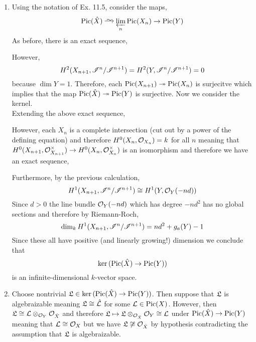 \documentclass[12pt]{article}
\begin{document}
\begin{enumerate}
\item Using the notation of Ex. 11.5, consider the maps,
\[ \Pic{\hat{X}} \iso \varprojlim_n \Pic{X_n} \to \Pic{Y} \]
As before, there is an exact sequence,
\begin{center}
\end{center}
However,
\[ H^2(X_{n+1}, \mathscr{I}^n / \mathscr{I}^{n+1}) = H^2(Y, \mathscr{I}^n / \mathscr{I}^{n+1}) = 0 \]
because $\dim{Y} = 1$. Therefore, each $\mathrm{Pic}(X_{n+1}) \twoheadrightarrow \mathrm{Pic}(X_n)$ is surjecitve which implies that the map $\mathrm{Pic}(\hat{X}) \twoheadrightarrow \mathrm{Pic}(Y)$ is surjective. Now we consider the kernel.  
\bigskip\\
Extending the above exact sequence,
\begin{center}
\end{center}
However, each $X_n$ is a complete intersection (cut out by a power of the defining equation) and therefore $H^0(X_n, \mathcal{O}_{X_n}) = k$ for all $n$ meaning that $H^0(X_{n+1}, \mathcal{O}_{X_{n+1}}^\times) \to H^0(X_n, \mathcal{O}_{X_n}^\times)$ is an isomorphism and therefore we have an exact sequence,
\begin{center}
\end{center}
Furthermore, by the previous calculation,
\[ H^1(X_{n+1}, \mathscr{I}^n / \mathscr{I}^{n+1}) \cong H^1(Y, \mathcal{O}_{Y}(-nd)) \]
Since $d > 0$ the line bundle $\mathcal{O}_{Y}(-nd)$ which has degree $-nd^2$ has no global sections
and therefore by Riemann-Roch,
\[ \dim_k H^1(X_{n+1}, \mathscr{I}^n / \mathscr{I}^{n+1}) = nd^2 + g_a(Y) - 1 \] 
Since these all have positive (and linearly growing!) dimension we conclude that
\[ \ker{(\mathrm{Pic}(\hat{X}) \to \mathrm{Pic}(Y))} \]
is an infinite-dimensional $k$-vector space.

\item Choose nontrivial $\mathfrak{L} \in \ker{(\mathrm{Pic}(\hat{X}) \to \mathrm{Pic}(Y))}$. Then suppose that $\mathfrak{L}$ is algebraizable meaning $\mathfrak{L} \cong \hat{\mathcal{L}}$ for some $\mathcal{L} \in \mathrm{Pic}(X)$. However, then $\mathfrak{L} \cong \mathcal{L} \otimes_{\mathcal{O}_{Y}} \mathcal{O}_{\hat{X}}$ and therefore $\mathfrak{L} \mapsto \mathfrak{L} \otimes_{\mathcal{O}_{\hat{X}}} \mathcal{O}_{Y} \cong \mathcal{L}$ under $\mathrm{Pic}(\hat{X}) \to \mathrm{Pic}(Y)$ meaning that $\mathcal{L} \cong \mathcal{O}_{X}$ but we have $\mathfrak{L} \not\cong \mathcal{O}_{\hat{X}}$ by hypothesis contradicting the assumption that $\mathfrak{L}$ is algebraizable. 


\end{enumerate}
\end{document}
